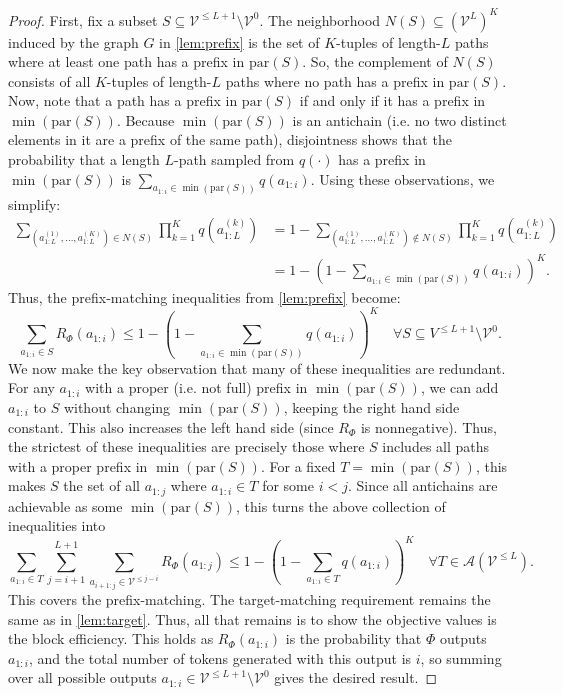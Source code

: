 \documentclass[10pt,a4paper]{amsart}
\newcommand{\V}{\mathcal{V}}
\newcommand{\pa}{\text{par}}
\begin{document}
\begin{proof}
First, fix a subset $S \subseteq \V^{\leq L+1} \setminus \V^0$. The neighborhood $N(S) \subseteq (\V^L)^K$ induced by the graph $G$ in \cref{lem:prefix} is the set of $K$-tuples of length-$L$ paths where at least one path has a prefix in $\pa(S)$. So, the complement of $N(S)$ consists of all $K$-tuples of length-$L$ paths where no path has a prefix in $\pa(S)$. Now, note that a path has a prefix in $\pa(S)$ if and only if it has a prefix in $\min(\pa(S))$. Because $\min(\pa(S))$ is an antichain (i.e. no two distinct elements in it are a prefix of the same path), disjointness shows that the probability that a length $L$-path sampled from $q(\cdot)$ has a prefix in $\min(\pa(S))$ is $\sum_{a_{1:i} \in \min(\pa(S))} q(a_{1:i})$. Using these observations, we simplify:
\begin{align}
    \sum_{\left(a^{(1)}_{1:L},\ldots,a^{(K)}_{1:L}\right) \in N(S)}  \prod_{k=1}^K q\left(a^{(k)}_{1:L}\right)
    &= 1 - \sum_{\left(a^{(1)}_{1:L},\ldots,a^{(K)}_{1:L}\right) \not \in N(S)}\prod_{k=1}^K q\left(a^{(k)}_{1:L}\right) \\
    &= 1 - \left(1 - \sum_{a_{1:i} \in \min(\pa(S))} q(a_{1:i})\right)^K.
\end{align}
Thus, the prefix-matching inequalities from \cref{lem:prefix} become:
\begin{equation}
    \sum_{a_{1:i} \in S} R_\Phi(a_{1:i}) \leq 1 - \left(1 - \sum_{a_{1:i} \in \min(\pa(S))} q(a_{1:i})\right)^K \quad \forall S \subseteq V^{\leq L+1} \setminus \V^0.
\end{equation}
We now make the key observation that many of these inequalities are redundant. For any $a_{1:i}$ with a proper (i.e. not full) prefix in $\min(\pa(S))$, we can add $a_{1:i}$ to $S$ without changing $\min(\pa(S))$, keeping the right hand side constant. This also increases the left hand side (since $R_\Phi$ is nonnegative). Thus, the strictest of these inequalities are precisely those where $S$ includes all paths with a proper prefix in $\min(\pa(S))$. For a fixed $T=\min(\pa(S))$, this makes $S$ the set of all $a_{1:j}$ where $a_{1:i} \in T$ for some $i<j$. Since all antichains are achievable as some $\min(\pa(S))$, this turns the above collection of inequalities into 
\begin{equation}
    \sum_{a_{1:i} \in T} \sum_{j=i+1}^{L+1} \sum_{a_{i+1:j} \in \V^{\leq j-i}} R_\Phi(a_{1:j}) \leq 1 - \left(1 - \sum_{a_{1:i} \in T} q(a_{1:i})\right)^K \quad \forall T \in \mathcal{A}(\V^{\leq L}).
\end{equation}
This covers the prefix-matching. The target-matching requirement remains the same as in \cref{lem:target}. Thus, all that remains is to show the objective values is the block efficiency. This holds as $R_\Phi(a_{1:i})$ is the probability that $\Phi$ outputs $a_{1:i}$, and the total number of tokens generated with this output is $i$, so summing over all possible outputs $a_{1:i} \in \V^{\leq L+1} \setminus \V^0$ gives the desired result.
\end{proof}
\end{document}
